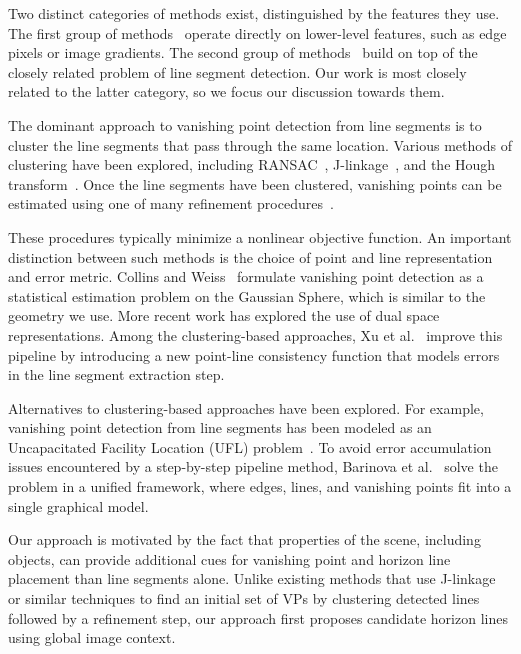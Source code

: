 Two distinct categories of methods exist, distinguished by the
features they use. The first group of methods~\cite{geoparser2010,
manhattanbayesian1999, edgebased2008,atlanta2004} operate directly
on lower-level features, such as edge pixels or image gradients.  The
second group of methods~\cite{nopriori2003, edgebased2008,
alignment2014, houghvp1994, selfsketch2012, wildenauer2012,
kitware2013} build on top of the closely related problem of line
segment detection.  Our work is most closely related to the latter
category, so we focus our discussion towards them.

The dominant approach to vanishing point detection from line segments
is to cluster the line segments that pass through the same location.
Various methods of clustering have been explored, including
RANSAC~\cite{ransac1981}, J-linkage~\cite{tardif2009}, and the Hough
transform~\cite{hough1959}. Once the line segments have been
clustered, vanishing points can be estimated using one of many
refinement procedures~\cite{alignment2014,atlanta2004,tardif2009,
wildenauer2012,kitware2013}. 

These procedures typically minimize a
nonlinear objective function. An important distinction between such
methods is the choice of point and line representation and error
metric. Collins and Weiss~\cite{unitsphere1990} formulate vanishing
point detection as a statistical estimation problem on the Gaussian
Sphere, which is similar to the geometry we use.  More recent work
has explored the use of dual space~\cite{alignment2014,dualspace2013}
representations. Among the clustering-based approaches, Xu et
al.~\cite{kitware2013} improve this pipeline by introducing a new
point-line consistency function that models errors in the line segment
extraction step.

Alternatives to clustering-based approaches have been explored.
For example, vanishing point detection from line segments has been
modeled as an Uncapacitated Facility Location (UFL)
problem~\cite{global2013, selfsketch2012}. To avoid error accumulation
issues encountered by a step-by-step pipeline method, Barinova et
al.~\cite{geoparser2010} solve the problem in a unified framework,
where edges, lines, and vanishing points fit into a single graphical
model.

Our approach is motivated by the fact that properties of the scene,
including objects, can provide additional cues for vanishing point and
horizon line placement than line segments alone. Unlike existing
methods that use J-linkage~\cite{tardif2009, kitware2013} or similar
techniques to find an initial set of VPs by clustering detected lines
followed by a refinement step, our approach first proposes candidate
horizon lines using global image context.  

